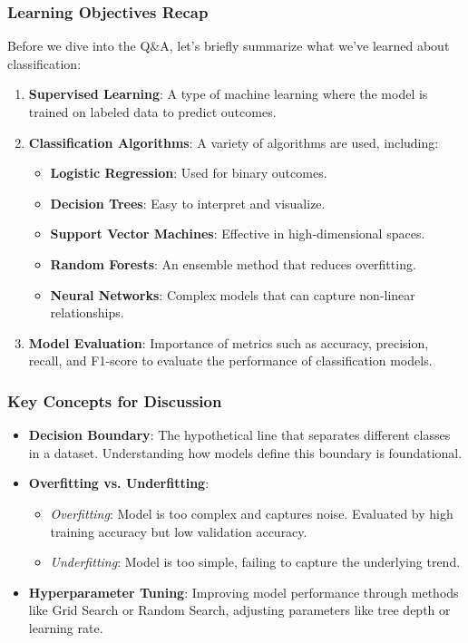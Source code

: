 \documentclass[aspectratio=169]{beamer}
\begin{document}
\begin{frame}
    \frametitle{Learning Objectives Recap}
    Before we dive into the Q\&A, let’s briefly summarize what we've learned about classification:
    \begin{enumerate}
        \item \textbf{Supervised Learning}: A type of machine learning where the model is trained on labeled data to predict outcomes.
        \item \textbf{Classification Algorithms}: A variety of algorithms are used, including:
        \begin{itemize}
            \item \textbf{Logistic Regression}: Used for binary outcomes.
            \item \textbf{Decision Trees}: Easy to interpret and visualize.
            \item \textbf{Support Vector Machines}: Effective in high-dimensional spaces.
            \item \textbf{Random Forests}: An ensemble method that reduces overfitting.
            \item \textbf{Neural Networks}: Complex models that can capture non-linear relationships.
        \end{itemize}
        \item \textbf{Model Evaluation}: Importance of metrics such as accuracy, precision, recall, and F1-score to evaluate the performance of classification models.
    \end{enumerate}
\end{frame}

\begin{frame}[fragile]
    \frametitle{Key Concepts for Discussion}
    \begin{itemize}
        \item \textbf{Decision Boundary}: The hypothetical line that separates different classes in a dataset. Understanding how models define this boundary is foundational.
        
        \item \textbf{Overfitting vs. Underfitting}:
        \begin{itemize}
            \item \textit{Overfitting}: Model is too complex and captures noise. Evaluated by high training accuracy but low validation accuracy. 
            \item \textit{Underfitting}: Model is too simple, failing to capture the underlying trend.
        \end{itemize}
        \item \textbf{Hyperparameter Tuning}: Improving model performance through methods like Grid Search or Random Search, adjusting parameters like tree depth or learning rate.
    \end{itemize}
\end{frame}
\end{document}
